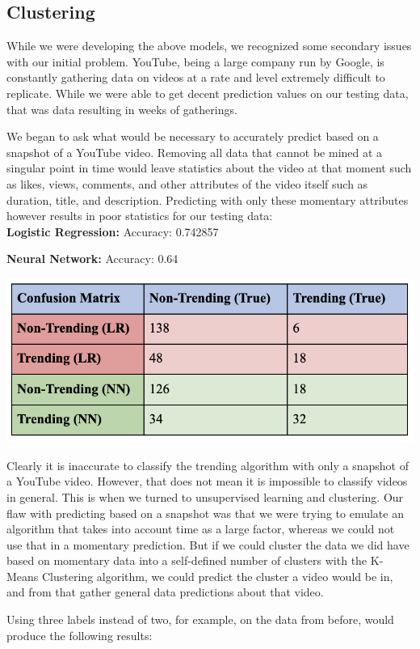 \documentclass{article}
\begin{document}
\subsection*{Clustering}

\quad While we were developing the above models, we recognized some secondary issues with our initial problem. YouTube, being a large company run by Google, is constantly gathering data on videos at a rate and level extremely difficult to replicate. While we were able to get decent prediction values on our testing data, that was data resulting in weeks of gatherings. 
\par We began to ask what would be necessary to accurately predict based on a snapshot of a YouTube video. Removing all data that cannot be mined at a singular point in time would leave statistics about the video at that moment such as likes, views, comments, and other attributes of the video itself such as duration, title, and description. Predicting with only these momentary attributes however results in poor statistics for our testing data: \\

\textbf{Logistic Regression:} Accuracy: 0.742857 
\par \textbf{Neural Network:} Accuracy: 0.64 
\begin{center}
\includegraphics[scale=.7]{momentary_at.png}\\
\end{center}
\quad Clearly it is inaccurate to classify the trending algorithm with only a snapshot of a YouTube video. However, that does not mean it is impossible to classify videos in general. This is when we turned to unsupervised learning and clustering. Our flaw with predicting based on a snapshot was that we were trying to emulate an algorithm that takes into account time as a large factor, whereas we could not use that in a momentary prediction. But if we could cluster the data we did have based on momentary data into a self-defined number of clusters with the K-Means Clustering algorithm, we could predict the cluster a video would be in, and from that gather general data predictions about that video.
\par Using three labels instead of two, for example, on the data from before, would produce the following results: \\
\end{document}
